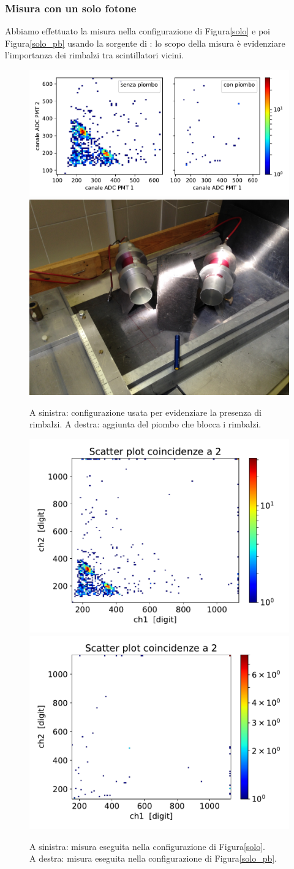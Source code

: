 \subsubsection{Misura con un solo fotone}

Abbiamo effettuato la misura nella configurazione di Figura\autoref{solo} e poi Figura\autoref{solo_pb} usando la sorgente di \cs{}: lo scopo della misura è evidenziare l'importanza dei rimbalzi tra scintillatori vicini.

\begin{figure}[h]
\centering
\subfloat
{\includegraphics[width=17 em]{immagini/rimb} \label{solo} }
\subfloat
{\includegraphics[width=17 em]{immagini/norimb} \label{solo_pb}}
\caption{A sinistra: configurazione usata per evidenziare la presenza di rimbalzi. A destra: aggiunta del piombo che blocca i rimbalzi.}
\end{figure}

\begin{figure}[h]
\centering
\subfloat
{
\includegraphics[width=18 em]{immagini/ce_ri}
\label{ce}
}
\subfloat
{
\includegraphics[width=18 em]{immagini/ce_pb}
\label{no_ce}
}
\caption{A sinistra: misura eseguita nella configurazione di Figura\autoref{solo}.\\
A destra: misura eseguita nella configurazione di Figura\autoref{solo_pb}.}
\end{figure}

